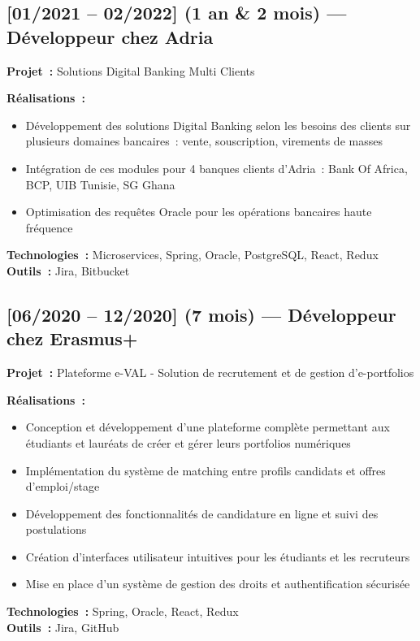 \subsection*{[01/2021 -- 02/2022] (1 an \& 2 mois) --- Développeur chez Adria}
\vspace{4pt}
\textbf{Projet~:} Solutions Digital Banking Multi Clients

\textbf{Réalisations~:}
\begin{itemize}
    \item Développement des solutions Digital Banking selon les besoins des clients sur plusieurs domaines bancaires~: vente, souscription, virements de masses
    \item Intégration de ces modules pour 4 banques clients d'Adria~: Bank Of Africa, BCP, UIB Tunisie, SG Ghana
    \item Optimisation des requêtes Oracle pour les opérations bancaires haute fréquence
\end{itemize}
\textbf{Technologies~:} Microservices, Spring, Oracle, PostgreSQL, React, Redux\\
\textbf{Outils~:} Jira, Bitbucket

\subsection*{[06/2020 -- 12/2020] (7 mois) --- Développeur chez Erasmus+}
\vspace{4pt}
\textbf{Projet~:} Plateforme e-VAL - Solution de recrutement et de gestion d'e-portfolios

\textbf{Réalisations~:}
\begin{itemize}
    \item Conception et développement d'une plateforme complète permettant aux étudiants et lauréats de créer et gérer leurs portfolios numériques
    \item Implémentation du système de matching entre profils candidats et offres d'emploi/stage
    \item Développement des fonctionnalités de candidature en ligne et suivi des postulations
    \item Création d'interfaces utilisateur intuitives pour les étudiants et les recruteurs
    \item Mise en place d'un système de gestion des droits et authentification sécurisée
\end{itemize}
\textbf{Technologies~:} Spring, Oracle, React, Redux\\
\textbf{Outils~:} Jira, GitHub

